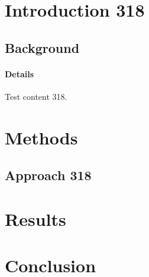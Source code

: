 \documentclass{article}
\begin{document}
\section{Introduction 318}
\subsection{Background}
\paragraph{Details} Test content 318.
\section{Methods}
\subsection{Approach 318}
\section{Results}
\section{Conclusion}
\end{document}

